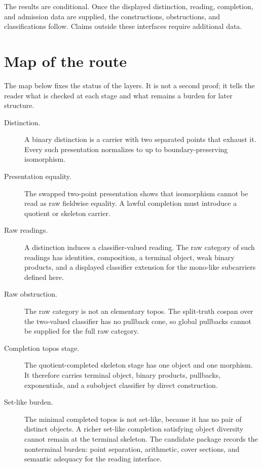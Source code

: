 \documentclass[11pt]{article}
\begin{document}
The results are conditional.  Once the displayed distinction, reading,
completion, and admission data are supplied, the constructions,
obstructions, and classifications follow.  Claims outside these
interfaces require additional data.

\section*{Map of the route}

The map below fixes the status of the layers.  It is not a second proof;
it tells the reader what is checked at each stage and what remains a
burden for later structure.

\begin{description}
\item[Distinction.] A binary distinction is a carrier with two separated
points that exhaust it.  Every such presentation normalizes to
 up to boundary-preserving isomorphism.

\item[Presentation equality.] The swapped two-point presentation shows
that isomorphism cannot be read as raw fieldwise equality.  A lawful
completion must introduce a quotient or skeleton carrier.

\item[Raw readings.] A distinction induces a classifier-valued reading.
The raw category of such readings has identities, composition, a
terminal object, weak binary products, and a displayed classifier
extension for the mono-like subcarriers defined here.

\item[Raw obstruction.] The raw category is not an elementary topos.  The
split-truth cospan over the two-valued classifier has no pullback cone,
so global pullbacks cannot be supplied for the full raw category.

\item[Completion topos stage.] The quotient-completed skeleton stage has
one object and one morphism.  It therefore carries terminal object,
binary products, pullbacks, exponentials, and a subobject classifier by
direct construction.

\item[Set-like burden.] The minimal completed topos is not set-like,
because it has no pair of distinct objects.  A richer set-like
completion satisfying object diversity cannot remain at the terminal
skeleton.  The candidate package records the nonterminal burden: point
separation, arithmetic, cover sections, and semantic adequacy for the
reading interface.


\end{description}
\end{document}
